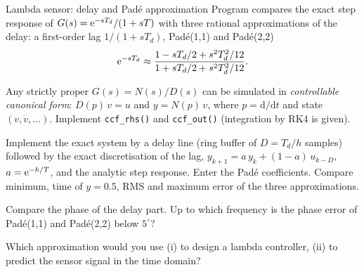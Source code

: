 \begin{exercise}{Lambda sensor: delay and Pad\'e approximation}{\JSLinux}
Program  compares the exact step
response of $G(s)=\mathrm{e}^{-sT_d}/(1+sT)$ with three rational approximations of the
delay: a first-order lag $1/(1+sT_d)$, Pad\'e(1,1) and Pad\'e(2,2)
\[
  \mathrm{e}^{-sT_d}\approx\frac{1-sT_d/2+s^2T_d^2/12}{1+sT_d/2+s^2T_d^2/12}.
\]
\begin{tasks}
  \item Any strictly proper $G(s)=N(s)/D(s)$ can be simulated in
    \emph{controllable canonical form}: $D(p)\,v=u$ and $y=N(p)\,v$,
    where $p=\mathrm d/\mathrm dt$ and state $(v,\dot v,\dots)$. Implement
    \texttt{ccf\_rhs()} and \texttt{ccf\_out()} (integration by RK4 is given).
  \item Implement the exact system by a delay line (ring buffer of
    $D=T_d/h$ samples) followed by the exact discretisation of the lag,
    $y_{k+1}=a\,y_k+(1-a)\,u_{k-D}$, $a=\mathrm{e}^{-h/T}$, and the analytic step
    response. Enter the Pad\'e coefficients. Compare minimum, time of
    $y=0.5$, RMS and maximum error of the three approximations.
  \item Compare the phase of the delay part. Up to which frequency is the
    phase error of Pad\'e(1,1) and Pad\'e(2,2) below $5^\circ$?
  \item Which approximation would you use (i) to design a lambda
    controller, (ii) to predict the sensor signal in the time domain?
\end{tasks}
\end{exercise}

